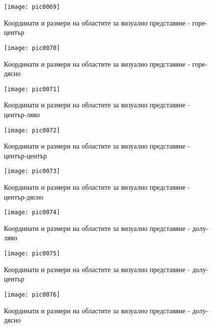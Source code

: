 \begin{figure}[h]
  \centering
  \texttt{[image: pic0069]}
  \caption{Координати и размери на областите за визуално представяне - горе-център}
\label{fig:pic0069}
\end{figure}
\FloatBarrier

\begin{figure}[h]
  \centering
  \texttt{[image: pic0070]}
  \caption{Координати и размери на областите за визуално представяне - горе-дясно}
\label{fig:pic0070}
\end{figure}
\FloatBarrier

\begin{figure}[h]
  \centering
  \texttt{[image: pic0071]}
  \caption{Координати и размери на областите за визуално представяне - център-ляво}
\label{fig:pic0071}
\end{figure}
\FloatBarrier

\begin{figure}[h]
  \centering
  \texttt{[image: pic0072]}
  \caption{Координати и размери на областите за визуално представяне - център-център}
\label{fig:pic0072}
\end{figure}
\FloatBarrier

\begin{figure}[h]
  \centering
  \texttt{[image: pic0073]}
  \caption{Координати и размери на областите за визуално представяне - център-дясно}
\label{fig:pic0073}
\end{figure}
\FloatBarrier

\begin{figure}[h]
  \centering
  \texttt{[image: pic0074]}
  \caption{Координати и размери на областите за визуално представяне - долу-ляво}
\label{fig:pic0074}
\end{figure}
\FloatBarrier

\begin{figure}[h]
  \centering
  \texttt{[image: pic0075]}
  \caption{Координати и размери на областите за визуално представяне - долу-център}
\label{fig:pic0075}
\end{figure}
\FloatBarrier

\begin{figure}[h]
  \centering
  \texttt{[image: pic0076]}
  \caption{Координати и размери на областите за визуално представяне - долу-дясно}
\label{fig:pic0076}
\end{figure}
\FloatBarrier

